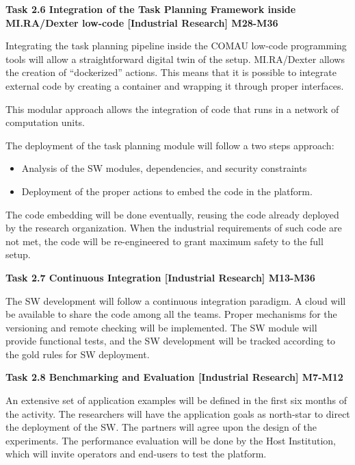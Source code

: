 \begin{planactivitybody}
\plantaskskip
\textbf{Task 2.6 Integration of the Task Planning Framework inside
MI.RA/Dexter low-code {[}Industrial Research{]} M28-M36}

Integrating the task planning pipeline inside the COMAU low-code
programming tools will allow a straightforward digital twin of the
setup. MI.RA/Dexter allows the creation of ``dockerized'' actions. This
means that it is possible to integrate external code by creating a
container and wrapping it through proper interfaces.

This modular approach allows the integration of code that runs in a
network of computation units.

The deployment of the task planning module will follow a two steps
approach:

\begin{itemize}
\item
  Analysis of the SW modules, dependencies, and security constraints
\item
  Deployment of the proper actions to embed the code in the platform.
\end{itemize}

The code embedding will be done eventually, reusing the code already
deployed by the research organization. When the industrial requirements
of such code are not met, the code will be re-engineered to grant
maximum safety to the full setup.

\plantaskskip
\textbf{Task 2.7 Continuous Integration {[}Industrial Research{]}
M13-M36}

The SW development will follow a continuous integration paradigm. A
cloud will be available to share the code among all the teams. Proper
mechanisms for the versioning and remote checking will be implemented.
The SW module will provide functional tests, and the SW development will
be tracked according to the gold rules for SW deployment.

\plantaskskip
\textbf{Task 2.8 Benchmarking and Evaluation {[}Industrial Research{]}
M7-M12}

An extensive set of application examples will be defined in the first
six months of the activity. The researchers will have the application
goals as north-star to direct the deployment of the SW. The partners
will agree upon the design of the experiments. The performance
evaluation will be done by the Host Institution, which will invite
operators and end-users to test the platform.
\end{planactivitybody}


